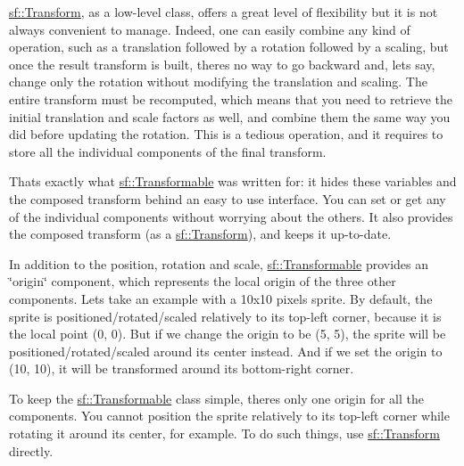 \mbox{\hyperlink{classsf_1_1_transform}{sf\+::\+Transform}}, as a low-\/level class, offers a great level of flexibility but it is not always convenient to manage. Indeed, one can easily combine any kind of operation, such as a translation followed by a rotation followed by a scaling, but once the result transform is built, there\textquotesingle{}s no way to go backward and, let\textquotesingle{}s say, change only the rotation without modifying the translation and scaling. The entire transform must be recomputed, which means that you need to retrieve the initial translation and scale factors as well, and combine them the same way you did before updating the rotation. This is a tedious operation, and it requires to store all the individual components of the final transform.

That\textquotesingle{}s exactly what \mbox{\hyperlink{classsf_1_1_transformable}{sf\+::\+Transformable}} was written for\+: it hides these variables and the composed transform behind an easy to use interface. You can set or get any of the individual components without worrying about the others. It also provides the composed transform (as a \mbox{\hyperlink{classsf_1_1_transform}{sf\+::\+Transform}}), and keeps it up-\/to-\/date.

In addition to the position, rotation and scale, \mbox{\hyperlink{classsf_1_1_transformable}{sf\+::\+Transformable}} provides an \char`\"{}origin\char`\"{} component, which represents the local origin of the three other components. Let\textquotesingle{}s take an example with a 10x10 pixels sprite. By default, the sprite is positioned/rotated/scaled relatively to its top-\/left corner, because it is the local point (0, 0). But if we change the origin to be (5, 5), the sprite will be positioned/rotated/scaled around its center instead. And if we set the origin to (10, 10), it will be transformed around its bottom-\/right corner.

To keep the \mbox{\hyperlink{classsf_1_1_transformable}{sf\+::\+Transformable}} class simple, there\textquotesingle{}s only one origin for all the components. You cannot position the sprite relatively to its top-\/left corner while rotating it around its center, for example. To do such things, use \mbox{\hyperlink{classsf_1_1_transform}{sf\+::\+Transform}} directly.

